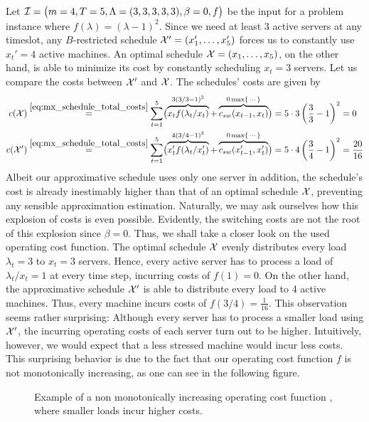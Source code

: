 \begin{exmpl}
Let $\mathcal{I}=\bigl(m=4,T=5,\Lambda=(3,3,3,3,3),\beta=0,f\bigr)$ be the input for a problem instance where $f(\lambda)=(\lambda-1)^2$. Since we need at least 3 active servers at any timeslot, any $B$-restricted schedule $\mathcal{X}'=(x_1',\dotsc,x_5')$ forces us to constantly use $x_t'=4$ active machines. An optimal schedule $\mathcal{X}=(x_1,\dotsc,x_5)$, on the other hand, is able to minimize its cost by constantly scheduling $x_t=3$ servers. Let us compare the costs between $\mathcal{X}'$ and $\mathcal{X}$. The schedules' costs are given by
\begin{align*}
	c(\mathcal{X})&\stackrel{\eqref{eq:mx_schedule_total_costs}}{=}\sum\limits_{t=1}^{5}\bigl(\overbrace{x_tf(\lambda_t/x_t)}^{3(3/3-1)^2}+\overbrace{c_{sw}(x_{t-1},x_t)}^{0\max\{\,\cdots\}}\bigr)=5\cdot3\left(\frac{3}{3}-1\right)^2=0\\
	c(\mathcal{X}')&\stackrel{\eqref{eq:mx_schedule_total_costs}}{=}\sum\limits_{t=1}^{5}\bigl(\overbrace{x_t'f(\lambda_t/x_t')}^{4(3/4-1)^2}+\overbrace{c_{sw}(x_{t-1}',x_t')}^{0\max\{\,\cdots\}}\bigr)=5\cdot4\left(\frac{3}{4}-1\right)^2=\frac{20}{16} 
\end{align*}
Albeit our approximative schedule uses only one server in addition, the schedule's cost is already inestimably higher than that of an optimal schedule $\mathcal{X}$, preventing any sensible approximation estimation. Naturally, we may ask ourselves how this explosion of costs is even possible. Evidently, the switching costs are not the root of this explosion since $\beta=0$. Thus, we shall take a closer look on the used operating cost function. The optimal schedule $\mathcal{X}$ evenly distributes every load $\lambda_t=3$ to $x_t=3$ servers. Hence, every active server has to process a load of $\lambda_t/x_t=1$ at every time step, incurring costs of $f(1)=0$. On the other hand, the approximative schedule $\mathcal{X}'$ is able to distribute every load to 4 active machines. Thus, every machine incurs costs of $f(3/4)=\frac{1}{16}$. This observation seems rather surprising: Although every server has to process a smaller load using $\mathcal{X}'$, the incurring operating costs of each server turn out to be higher. Intuitively, however, we would expect that a less stressed machine would incur less costs. This surprising behavior is due to the fact that our operating cost function $f$ is not monotonically increasing, as one can see in the following figure.
\begin{figure}[H]
\centering

\caption{Example of a non monotonically increasing operating cost function , where smaller loads incur higher costs.}
\label{fig:non_mono_incr_f}
\end{figure}
\end{exmpl}
